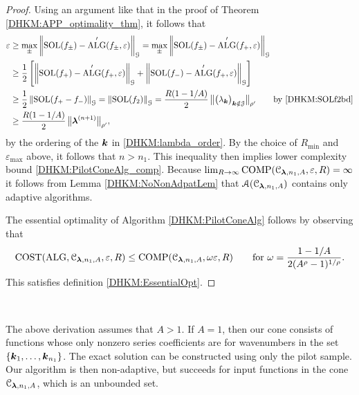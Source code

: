 \documentclass[USenglish]{article}
\theoremstyle{dgthm}
\theoremstyle{dgthm}
\theoremstyle{dgthm}
\theoremstyle{dgthm}
\theoremstyle{dgdef}
\theoremstyle{definition}
\DeclareMathOperator{\DHKMSOL}{SOL}
\DeclareMathOperator{\DHKMALG}{ALG}
\DeclareMathOperator{\DHKMCOST}{COST}
\DeclareMathOperator{\DHKMCOMP}{COMP}
\newcommand{\DHKMnorm}[2][{}]{\ensuremath{\left \lVert #2 \right \rVert}_{#1}}
\newcommand{\DHKMbignorm}[2][{}]{\ensuremath{\bigl \lVert #2 \bigr \rVert}_{#1}}
\begin{document}
\begin{proof}
Using an argument like that in the proof of  Theorem \ref{DHKM:APP_optimality_thm}, it follows that 
\begin{align*}
\varepsilon & \ge \max_{\pm} \DHKMnorm[\calG]{\DHKMSOL(f_{\pm}) - \DHKMALG'(f_{\pm},\varepsilon)} 
=  \max_{\pm} \DHKMnorm[\calG]{\DHKMSOL(f_{\pm}) - \DHKMALG'(f_{+},\varepsilon)} \\
& \ge \frac 12 \left [ \DHKMnorm[\calG]{\DHKMSOL(f_{+}) - \DHKMALG'(f_{+},\varepsilon)} 
+ \DHKMnorm[\calG]{\DHKMSOL(f_{-}) - \DHKMALG'(f_{+},\varepsilon)}  \right] \\
& \ge \frac 12 \DHKMnorm[\calG]{\DHKMSOL(f_+ - f_-)} = \DHKMnorm[\calG]{\DHKMSOL(f_2)} 
=\frac{R(1 - 1/A)}{2} \, \DHKMbignorm[\rho']{\bigl(  \lambda_{\bsk}  \bigr)_{\bsk \notin \calJ}} \qquad \text{by \eqref{DHKM:SOLf2bd}} \\
& \ge \frac{R(1 - 1/A)}{2} \, \DHKMbignorm[\rho']{\bslambda^{(n+1)}} ,
\end{align*}
by the ordering of the ${\boldsymbol{k}}$ in \eqref{DHKM:lambda_order}.  By the choice of $R_{\min}$ and $\varepsilon_{\max}$ above, it follows that $n > n_1$.  This inequality then implies lower complexity bound \eqref{DHKM:PilotConeAlg_comp}. Because $\lim_{R \to \infty} \DHKMCOMP(\calC_{\boldsymbol{\lambda},n_1,A}, \varepsilon,R) = \infty$  it follows from Lemma \ref{DHKM:NoNonAdpatLem} that ${\mathcal{A}}({\mathcal{C}}_{\boldsymbol{\lambda},n_1,A})$ contains only adaptive algorithms.

The essential optimality of Algorithm \ref{DHKM:PilotConeAlg} follows by observing that 
\[
\DHKMCOST(\DHKMALG,\calC_{\boldsymbol{\lambda},n_1,A},\varepsilon,R) \le \DHKMCOMP(\calC_{\boldsymbol{\lambda},n_1,A},\omega \varepsilon,R) \qquad \text{for } \omega = \frac{1-1/A}{2(A^\rho -1)^{1/\rho}}.
\]
This satisfies definition \eqref{DHKM:EssentialOpt}.  
\end{proof} \

The above derivation assumes that $A > 1$.  If $A =1$, then our cone consists of functions whose only nonzero series coefficients are for wavenumbers in the set $\{{\boldsymbol{k}}_1, \ldots, {\boldsymbol{k}}_{n_1}\}$.  The exact solution can be constructed using only the pilot sample.  Our algorithm is then non-adaptive, but succeeds for input functions in the cone ${\mathcal{C}}_{\boldsymbol{\lambda},n_1,A}$, which is an unbounded set.
\end{document}
